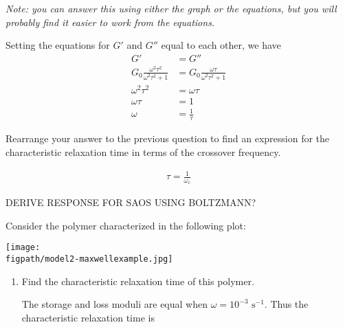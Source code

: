 \begin{activity}
\begin{ctqs}
		\emph{Note: you can answer this using either the graph or the equations, but you will probably find it easier to work from the equations.}
	
					\begin{solution}[1.75in]
					
						Setting the equations for $G'$ and $G''$ equal to each other, we have
						\begin{align*}
							G' &= G''\\
							G_0 \frac{\omega^2 \tau^2}{\omega^2 \tau^2 + 1} &= G_0 \frac{\omega \tau}{\omega^2 \tau^2 + 1}\\
							\omega^2 \tau^2 &= \omega \tau\\
							\omega\tau &= 1\\
							\omega &= \frac{1}{\tau}
						\end{align*}
					\end{solution}
	
	\question Rearrange your answer to the previous question to find an expression for the characteristic relaxation time in terms of the crossover frequency.
	
					\begin{solution}[1in]
					
						\begin{align*}
							\tau = \frac{1}{\omega_c}
						\end{align*}
					\end{solution}
	
\end{ctqs}
	

\begin{exercises}

		\exercise \label{\labelbase:exc:Boltzmann} DERIVE RESPONSE FOR SAOS USING BOLTZMANN?

		\exercise Consider the polymer characterized in the following plot:
				
		\centerline{\texttt{[image: \\figpath/model2-maxwellexample.jpg]}}
		
		\begin{enumerate}
		
			\item Find the characteristic relaxation time of this polymer.
	
					\begin{solution}
					
						The storage and loss moduli are equal when $\omega=10^{-3}\text{ s}^{-1}$.  Thus the characteristic relaxation time is
						

\end{solution}
\end{enumerate}
\end{exercises}
\end{activity}
